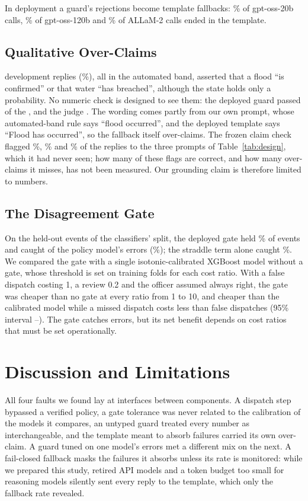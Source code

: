 \documentclass[conference]{IEEEtran}
\begin{document}
In deployment a guard's rejections become template fallbacks: \FbTwenty\% of gpt-oss-20b calls, \FbOneTwenty\% of gpt-oss-120b and \FbAllam\% of ALLaM-2 calls ended in the template.

\subsection{Qualitative Over-Claims}
\label{sec:claims}
\OcDev{} development replies (\OcDevPct\%), all in the automated band, asserted that a flood ``is confirmed'' or that water ``has breached'', although the state holds only a probability. No numeric check is designed to see them: the deployed guard passed \OcDevPassDep{} of the \OcDev, and the judge \OcDevPassJud. The wording comes partly from our own prompt, whose automated-band rule says ``flood occurred'', and the deployed template says ``Flood has occurred'', so the fallback itself over-claims. The frozen claim check flagged \VarBaseClaim\%, \VarNoetaClaim\% and \VarSlotsClaim\% of the replies to the three prompts of Table~\ref{tab:design}, which it had never seen; how many of these flags are correct, and how many over-claims it misses, has not been measured. Our grounding claim is therefore limited to numbers.

\subsection{The Disagreement Gate}
On the \CalTest{} held-out events of the classifiers' split, the deployed gate held \GateDepHold\% of events and caught \GtDepCaught{} of the policy model's \GtErrN{} errors (\GtDepRecall\%); the straddle term alone caught \GtStRecall\%. We compared the gate with a single isotonic-calibrated XGBoost model without a gate, whose threshold is set on training folds for each cost ratio. With a false dispatch costing 1, a review 0.2 and the officer assumed always right, the gate was cheaper than no gate at every ratio from 1 to 10, and cheaper than the calibrated model while a missed dispatch costs less than \BeR{} false dispatches (95\% interval \BeLo--\BeHi). The gate catches errors, but its net benefit depends on cost ratios that must be set operationally.

\section{Discussion and Limitations}
All four faults we found lay at interfaces between components. A dispatch step bypassed a verified policy, a gate tolerance was never related to the calibration of the models it compares, an untyped guard treated every number as interchangeable, and the template meant to absorb failures carried its own over-claim. A guard tuned on one model's errors met a different mix on the next. A fail-closed fallback masks the failures it absorbs unless its rate is monitored: while we prepared this study, retired API models and a token budget too small for reasoning models silently sent every reply to the template, which only the fallback rate revealed.
\end{document}
